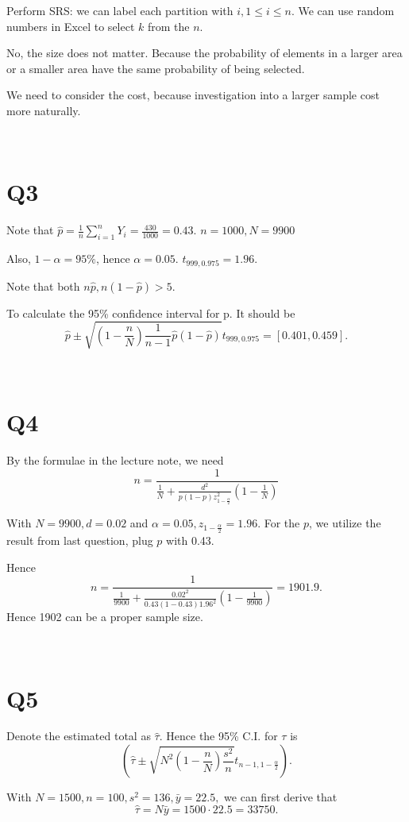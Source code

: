 \documentclass[12pt]{article}%
\begin{document}
Perform SRS: we can label each partition with $i,1\leq i\leq n.$ We can use random numbers in Excel to select $k$ from the $n$.

No, the size does not matter. Because the probability of elements in a larger area or a smaller area have the same probability of being selected.

We need to consider the cost, because investigation into a larger sample cost more naturally.

~\ 

\section{Q3}
Note that $\hat{p}=\frac{1}{n}\sum_{i=1}^{n}Y_i=\frac{430}{1000}=0.43.$ $n=1000,N=9900$

Also, $1-\alpha=95\%$, hence $\alpha=0.05.$ $t_{999,0.975}=1.96.$

Note that both $n\hat{p},n(1-\hat{p}) >5.$

To calculate the 95\% confidence interval for p. It should be $$\hat{p}\pm\sqrt{(1-\frac{n}{N})\frac{1}{n-1}\hat{p}(1-\hat{p})}t_{999,0.975}=[0.401,0.459].$$

~\   

\section{Q4}
By the formulae in the lecture note, we need $$n=\frac{1}{\frac{1}{N}+\frac{d^2}{p(1-p)z_{1-\frac{\alpha}{2}}^2}(1-\frac{1}{N})}$$

With $N=9900,d=0.02$ and $\alpha=0.05, z_{1-\frac{\alpha}{2}}=1.96.$ For the $p$, we utilize the result from last question, plug $p$ with 0.43.

Hence $$n=\frac{1}{\frac{1}{9900}+\frac{0.02^2}{0.43(1-0.43)1.96^2}(1-\frac{1}{9900})}=1901.9.$$ Hence 1902 can be a proper sample size.

~\ 

\section{Q5}

Denote the estimated total as $\hat{\tau}.$ Hence the 95\% C.I. for $\tau$ is $$(\hat{\tau}\pm \sqrt{N^2(1-\frac{n}{N})\frac{s^2}{n}}t_{n-1,1-\frac{\alpha}{2}}).$$

With $N=1500,n=100,s^2=136,\bar{y}=22.5,$ we can first derive that $$\hat{\tau}=N\bar{y}=1500\cdot 22.5=33750.$$
\end{document}

